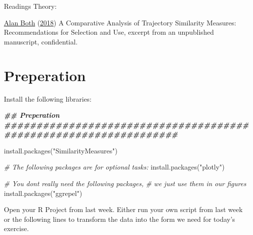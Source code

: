 \documentclass[
]{book}
\newenvironment{Shaded}{\begin{snugshade}}{\end{snugshade}}
\newcommand{\CommentTok}[1]{\textcolor[rgb]{0.56,0.35,0.01}{\textit{#1}}}
\newcommand{\DocumentationTok}[1]{\textcolor[rgb]{0.56,0.35,0.01}{\textbf{\textit{#1}}}}
\newcommand{\FunctionTok}[1]{\textcolor[rgb]{0.00,0.00,0.00}{#1}}
\newcommand{\NormalTok}[1]{#1}
\newcommand{\StringTok}[1]{\textcolor[rgb]{0.31,0.60,0.02}{#1}}
\begin{document}
Readings Theory:

\protect\hyperlink{ref-both2018}{Alan Both} (\protect\hyperlink{ref-both2018}{2018}) A Comparative Analysis of Trajectory Similarity Measures: Recommendations for Selection and Use, excerpt from an unpublished manuscript, confidential.

\hypertarget{preperation-2}{%
\section{Preperation}\label{preperation-2}}

Install the following libraries:

\begin{Shaded}
\begin{Highlighting}[]

\DocumentationTok{\#\# Preperation \#\#\#\#\#\#\#\#\#\#\#\#\#\#\#\#\#\#\#\#\#\#\#\#\#\#\#\#\#\#\#\#\#\#\#\#\#\#\#\#\#\#\#\#\#\#\#\#\#\#\#\#\#\#\#\#\#\#\#\#\#\#\#\#\#}

\FunctionTok{install.packages}\NormalTok{(}\StringTok{"SimilarityMeasures"}\NormalTok{)}

\CommentTok{\# The following packages are for optional tasks:}
\FunctionTok{install.packages}\NormalTok{(}\StringTok{"plotly"}\NormalTok{)}

\CommentTok{\# You don\textquotesingle{}t really need the following packages, }
\CommentTok{\# we just use them in our figures}
\FunctionTok{install.packages}\NormalTok{(}\StringTok{"ggrepel"}\NormalTok{)}
\end{Highlighting}
\end{Shaded}

Open your R Project from last week. Either run your own script from last week or the following lines to transform the data into the form we need for today's exercise.
\end{document}
